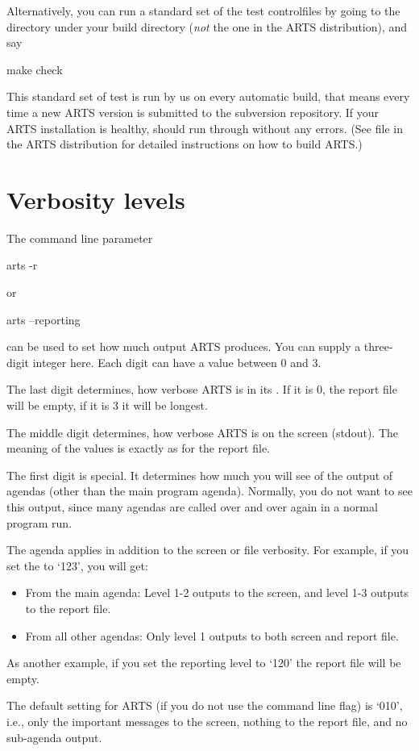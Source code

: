 Alternatively, you can run a standard set of the test controlfiles by
going to the  directory under your build directory
(\emph{not} the one in the ARTS distribution), and say
\begin{code}
  make check
\end{code}
This standard set of test is run by us on every automatic build, that
means every time a new ARTS version is submitted to the subversion
repository. If your ARTS installation is healthy,  should run through without any errors. (See file
 in the ARTS distribution for detailed instructions
on how to build ARTS.)

\section{Verbosity levels}

The command line parameter 
\begin{code}
  arts -r
\end{code}
or
\begin{code}
  arts --reporting
\end{code}
can be used to set how much output ARTS produces. You can supply a
three-digit integer here. Each digit can have a value between 0 and 3.

The last digit determines, how verbose ARTS is in its
. If it is 0, the report file will be empty, if
it is 3 it will be longest.

The middle digit determines, how verbose ARTS is on the screen
(stdout). The meaning of the values is exactly as for the report
file. 

The first digit is special. It determines how much you will see of the
output of agendas (other than the main program agenda). Normally, you
do not want to see this output, since many agendas are called over and
over again in a normal program run. 

The agenda  applies in addition to the screen or
file verbosity. For example, if you set the  to `123', you will get:
\begin{itemize}
\item From the main agenda: Level 1-2 outputs to the screen, and level
  1-3 outputs to the report file.
\item From all other agendas: Only level 1 outputs to both screen and
  report file.
\end{itemize}
As another example, if you set the reporting level to `120' the
report file will be empty.

The default setting for ARTS (if you do not use the command line flag)
is `010', i.e., only the important messages to the screen, nothing to
the report file, and no sub-agenda output.


